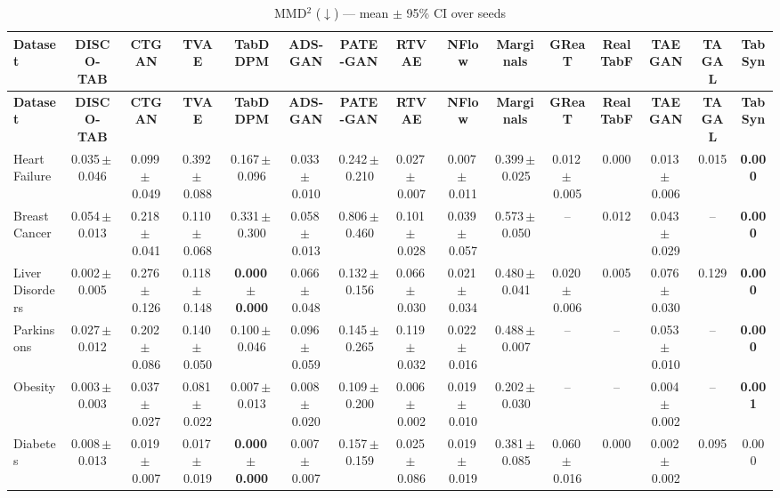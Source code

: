 \documentclass[8pt]{extarticle}
\begin{document}
\begin{longtable}{l*{14}{c}}
\caption{MMD$^2$ ($\downarrow$) --- mean $\pm$ 95\% CI over seeds}\\
\toprule
\textbf{Dataset} & \textbf{DISCO-TAB} & \textbf{CTGAN} & \textbf{TVAE} & \textbf{TabDDPM} & \textbf{ADS-GAN} & \textbf{PATE-GAN} & \textbf{RTVAE} & \textbf{NFlow} & \textbf{Marginals} & \textbf{GReaT} & \textbf{RealTabF} & \textbf{TAEGAN} & \textbf{TAGAL} & \textbf{TabSyn} \\
\midrule
\endfirsthead
\toprule
\textbf{Dataset} & \textbf{DISCO-TAB} & \textbf{CTGAN} & \textbf{TVAE} & \textbf{TabDDPM} & \textbf{ADS-GAN} & \textbf{PATE-GAN} & \textbf{RTVAE} & \textbf{NFlow} & \textbf{Marginals} & \textbf{GReaT} & \textbf{RealTabF} & \textbf{TAEGAN} & \textbf{TAGAL} & \textbf{TabSyn} \\
\midrule
\endhead
\bottomrule
\endfoot
Heart Failure & 0.035\,$\pm$\,0.046 & 0.099\,$\pm$\,0.049 & 0.392\,$\pm$\,0.088 & 0.167\,$\pm$\,0.096 & 0.033\,$\pm$\,0.010 & 0.242\,$\pm$\,0.210 & 0.027\,$\pm$\,0.007 & 0.007\,$\pm$\,0.011 & 0.399\,$\pm$\,0.025 & 0.012\,$\pm$\,0.005 & 0.000 & 0.013\,$\pm$\,0.006 & 0.015 & \textbf{0.000} \\
Breast Cancer & 0.054\,$\pm$\,0.013 & 0.218\,$\pm$\,0.041 & 0.110\,$\pm$\,0.068 & 0.331\,$\pm$\,0.300 & 0.058\,$\pm$\,0.013 & 0.806\,$\pm$\,0.460 & 0.101\,$\pm$\,0.028 & 0.039\,$\pm$\,0.057 & 0.573\,$\pm$\,0.050 & -- & 0.012 & 0.043\,$\pm$\,0.029 & -- & \textbf{0.000} \\
Liver Disorders & 0.002\,$\pm$\,0.005 & 0.276\,$\pm$\,0.126 & 0.118\,$\pm$\,0.148 & \textbf{0.000\,$\pm$\,0.000} & 0.066\,$\pm$\,0.048 & 0.132\,$\pm$\,0.156 & 0.066\,$\pm$\,0.030 & 0.021\,$\pm$\,0.034 & 0.480\,$\pm$\,0.041 & 0.020\,$\pm$\,0.006 & 0.005 & 0.076\,$\pm$\,0.030 & 0.129 & \textbf{0.000} \\
Parkinsons & 0.027\,$\pm$\,0.012 & 0.202\,$\pm$\,0.086 & 0.140\,$\pm$\,0.050 & 0.100\,$\pm$\,0.046 & 0.096\,$\pm$\,0.059 & 0.145\,$\pm$\,0.265 & 0.119\,$\pm$\,0.032 & 0.022\,$\pm$\,0.016 & 0.488\,$\pm$\,0.007 & -- & -- & 0.053\,$\pm$\,0.010 & -- & \textbf{0.000} \\
Obesity & 0.003\,$\pm$\,0.003 & 0.037\,$\pm$\,0.027 & 0.081\,$\pm$\,0.022 & 0.007\,$\pm$\,0.013 & 0.008\,$\pm$\,0.020 & 0.109\,$\pm$\,0.200 & 0.006\,$\pm$\,0.002 & 0.019\,$\pm$\,0.010 & 0.202\,$\pm$\,0.030 & -- & -- & 0.004\,$\pm$\,0.002 & -- & \textbf{0.001} \\
Diabetes & 0.008\,$\pm$\,0.013 & 0.019\,$\pm$\,0.007 & 0.017\,$\pm$\,0.019 & \textbf{0.000\,$\pm$\,0.000} & 0.007\,$\pm$\,0.007 & 0.157\,$\pm$\,0.159 & 0.025\,$\pm$\,0.086 & 0.019\,$\pm$\,0.019 & 0.381\,$\pm$\,0.085 & 0.060\,$\pm$\,0.016 & 0.000 & 0.002\,$\pm$\,0.002 & 0.095 & 0.000 \\

\end{longtable}
\end{document}

